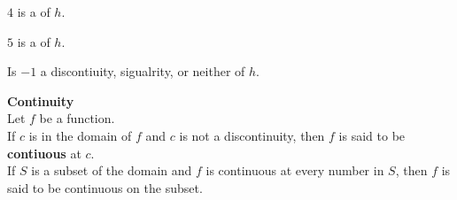 \documentclass{ximera}
\begin{document}
\begin{example}
\begin{question}
$4$ is a  of $h$.


\end{question}





\begin{question}

$5$ is a  of $h$.


\end{question}





\begin{question}

Is $-1$ a discontiuity, sigualrity, or neither of $h$.

\begin{multipleChoice}
\end{multipleChoice}


\end{question}







\end{example}






\begin{definition} \textbf{\textcolor{green!50!black}{Continuity}} \\


Let $f$ be a function. \\
If $c$ is in the domain of $f$ and $c$ is not a discontinuity, then $f$ is said to be \textbf{contiuous} at $c$. \\


If $S$ is a subset of the domain and $f$ is continuous at every number in $S$, then $f$ is said to be continuous on the subset.


\end{definition}
\end{document}
